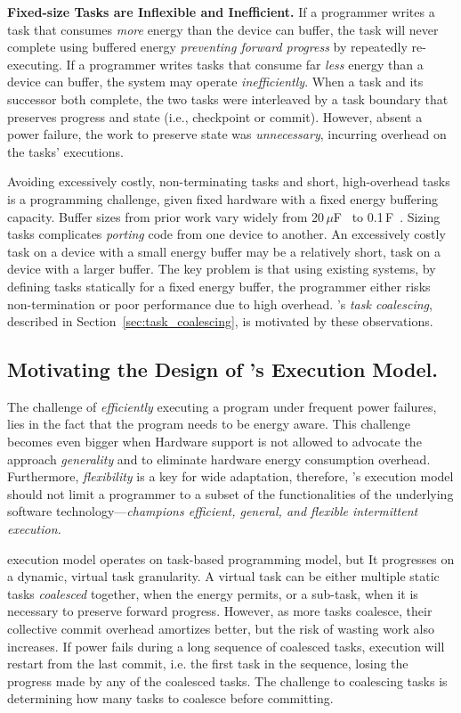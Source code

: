\textbf{Fixed-size Tasks are Inflexible and Inefficient.} If a programmer writes a task that consumes {\em more} energy than the device can buffer, the task will never complete using buffered energy {\em preventing forward progress} by repeatedly re-executing. If a programmer writes tasks that consume far {\em less} energy than a device can buffer, the system may operate {\em inefficiently}. When a task and its successor both complete, the two tasks were interleaved by a task boundary that preserves progress and state (i.e., checkpoint or commit). However, absent a power failure, the work to preserve state was {\em unnecessary}, incurring overhead on the tasks' executions.

Avoiding excessively costly, non-terminating tasks and short, high-overhead tasks is a programming challenge, given fixed hardware with a fixed energy buffering capacity. Buffer sizes from prior work vary widely from 20\,$\mu $F~\cite{rodriguez_tbcs_2015} to 0.1\,F~\cite{moo}. Sizing tasks complicates {\em porting} code from one device to another. An excessively costly task on a device with a small energy buffer may be a relatively short, task on a device with a larger buffer. The key problem is that using existing systems, by defining tasks statically for a fixed energy buffer, the programmer either risks non-termination or poor performance due to high overhead. \sys's {\em task coalescing}, described in Section~\ref{sec:task_coalescing}, is motivated by these observations.



\subsection {Motivating the Design of \sys's Execution Model.} 
The challenge of \emph{efficiently} executing a program under frequent power failures, lies in the fact that the program needs to be energy aware.  This challenge becomes even bigger when 
Hardware support is not allowed to advocate the approach \emph{generality} and to eliminate hardware energy consumption overhead. Furthermore, \emph{flexibility} is a key for wide adaptation, therefore, \sys's execution model should not limit a programmer to a subset of the functionalities of the underlying software technology---\emph{\sys champions efficient, general, and flexible intermittent execution.}

\sys execution model operates on task-based programming model, but It progresses on a dynamic, virtual task granularity. A virtual task can be either multiple static tasks \emph{coalesced} together, when the energy permits, or a sub-task, when it is necessary to preserve forward progress. However, as more tasks coalesce, their  collective commit overhead amortizes better, but the risk of wasting work also increases. If power fails during a long sequence of coalesced tasks, execution will restart from the last commit, i.e. the first task in the sequence, losing  the progress made by any of the coalesced tasks.  The challenge to coalescing tasks is determining how many tasks to coalesce before committing.



